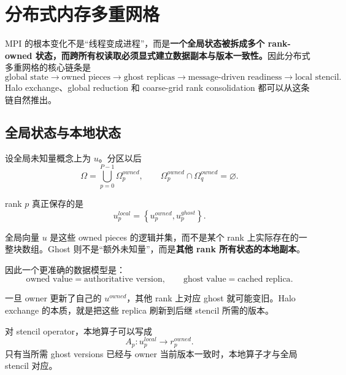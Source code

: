 \chapter{分布式内存多重网格}
\label{ch:mpi}

\begin{keybox}
MPI 的根本变化不是“线程变成进程”，而是\textbf{一个全局状态被拆成多个 rank-owned 状态，而跨所有权读取必须显式建立数据副本与版本一致性。}因此分布式多重网格的核心链条是
\begin{equation}
\boxed{
\text{global state}
\rightarrow
\text{owned pieces}
\rightarrow
\text{ghost replicas}
\rightarrow
\text{message-driven readiness}
\rightarrow
\text{local stencil}.
}
\label{eq:mpi-mental-model}
\end{equation}
Halo exchange、global reduction 和 coarse-grid rank consolidation 都可以从这条链自然推出。
\end{keybox}

\section{全局状态与本地状态}

设全局未知量概念上为 $u$。分区以后
\begin{equation}
\Omega
=
\bigcup_{p=0}^{P-1}
\Omega_p^{owned},
\qquad
\Omega_p^{owned}
\cap
\Omega_q^{owned}
=
\varnothing.
\end{equation}

rank $p$ 真正保存的是
\begin{equation}
u_p^{local}
=
\left\{
u_p^{owned},
u_p^{ghost}
\right\}.
\label{eq:mpi-local-state}
\end{equation}

全局向量 $u$ 是这些 owned pieces 的逻辑并集，而不是某个 rank 上实际存在的一整块数组。Ghost 则不是“额外未知量”，而是\textbf{其他 rank 所有状态的本地副本}。

因此一个更准确的数据模型是：
\begin{equation}
\boxed{
\text{owned value}
=
\text{authoritative version},
\qquad
\text{ghost value}
=
\text{cached replica}.
}
\label{eq:mpi-owned-ghost-version}
\end{equation}

一旦 owner 更新了自己的 $u^{owned}$，其他 rank 上对应 ghost 就可能变旧。Halo exchange 的本质，就是把这些 replica 刷新到后继 stencil 所需的版本。

对 stencil operator，本地算子可以写成
\begin{equation}
A_p:
u_p^{local}
\longrightarrow
r_p^{owned}.
\label{eq:mpi-local-operator}
\end{equation}
只有当所需 ghost versions 已经与 owner 当前版本一致时，本地算子才与全局 stencil 对应。


